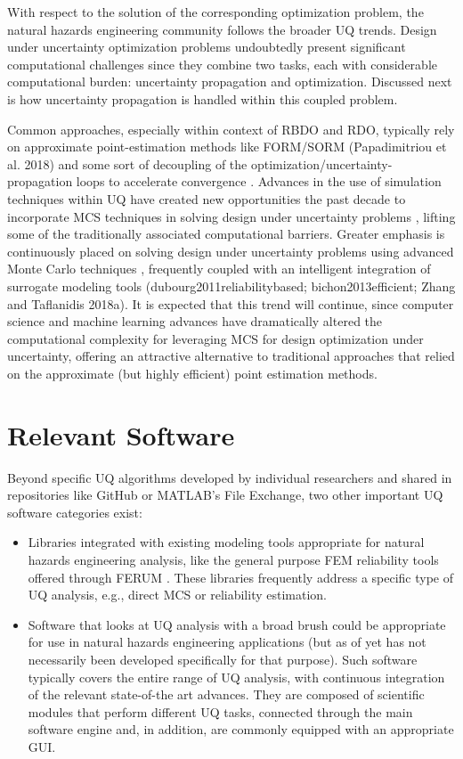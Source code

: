 With respect to the solution of the corresponding optimization problem, the natural hazards engineering community follows the broader UQ trends. Design under uncertainty optimization problems undoubtedly present significant computational challenges since they combine two tasks, each with considerable computational burden: uncertainty propagation and optimization. Discussed next is how uncertainty propagation is handled within this coupled problem.

Common approaches, especially within context of RBDO and RDO, typically rely on approximate point-estimation methods like FORM/SORM (Papadimitriou et al. 2018) and some sort of decoupling of the optimization/uncertainty-propagation loops to accelerate convergence \citep{beyer2007robust}. Advances in the use of simulation techniques within UQ have created new opportunities the past decade to incorporate MCS techniques in solving design under uncertainty problems \citep{spall2003introduction,flint2016developing}, lifting some of the traditionally associated computational barriers. Greater emphasis is continuously placed on solving design under uncertainty problems using advanced Monte Carlo techniques \citep{medina2014adaptive}, frequently coupled with an intelligent integration of surrogate modeling tools (dubourg2011reliabilitybased; bichon2013efficient; Zhang and Taflanidis 2018a). It is expected that this trend will continue, since computer science and machine learning advances have dramatically altered the computational complexity for leveraging MCS for design optimization under uncertainty, offering an attractive alternative to traditional approaches that relied on the approximate (but highly efficient) point estimation methods.   

\section{Relevant Software}
\label{sec:uq_tools}

Beyond specific UQ algorithms developed by individual researchers and shared in repositories like GitHub or MATLAB’s File Exchange, two other important UQ software categories exist:

\begin{itemize}
    \item Libraries integrated with existing modeling tools appropriate for natural hazards engineering analysis, like the general purpose FEM reliability tools offered through FERUM \citep{bourinet2009review}. These libraries frequently address a specific type of UQ analysis, e.g., direct MCS or reliability estimation.
    \item Software that looks at UQ analysis with a broad brush could be appropriate for use in natural hazards engineering applications (but as of yet has not necessarily been developed specifically for that purpose). Such software typically covers the entire range of UQ analysis, with continuous integration of the relevant state-of-the art advances. They are composed of scientific modules that perform different UQ tasks, connected through the main software engine and, in addition, are commonly equipped with an appropriate GUI. 
\end{itemize}
	
